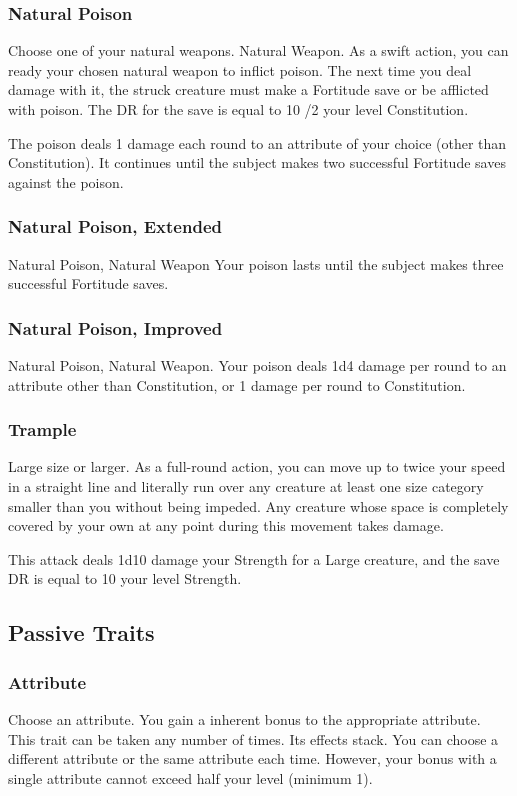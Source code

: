 \subsubsection{Natural Poison}
Choose one of your natural weapons.
\featpre Natural Weapon.
\featben As a swift action, you can ready your chosen natural weapon to inflict poison. The next time you deal damage with it, the struck creature must make a Fortitude save or be afflicted with poison. The DR for the save is equal to 10 /2 your level \add Constitution.
\par The poison deals 1 damage each round to an attribute of your choice (other than Constitution). It continues until the subject makes two successful Fortitude saves against the poison.

\subsubsection{Natural Poison, Extended}
\featpre Natural Poison, Natural Weapon
\featben Your poison lasts until the subject makes three successful Fortitude saves.

\subsubsection{Natural Poison, Improved}
\featpre Natural Poison, Natural Weapon.
\featben Your poison deals 1d4 damage per round to an attribute other than Constitution, or 1 damage per round to Constitution.

\subsubsection{Trample}
\featpre Large size or larger.
\featben As a full-round action, you can move up to twice your speed in a straight line and literally run over any creature at least one size category smaller than you without being impeded. Any creature whose space is completely covered by your own at any point during this movement takes damage.

This attack deals 1d10 damage \add your Strength for a Large creature, and the save DR is equal to 10 \add your level \add Strength.

\subsection{Passive Traits}

\subsubsection{Attribute}
Choose an attribute.
\featben You gain a  inherent bonus to the appropriate attribute.
 This trait can be taken any number of times. Its effects stack. You can choose a different attribute or the same attribute each time. However, your bonus with a single attribute cannot exceed half your level (minimum 1).

